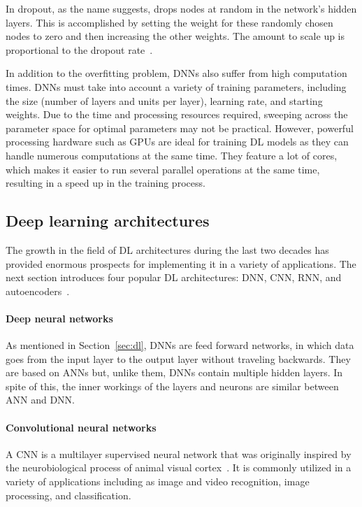 In dropout, as the name suggests, drops nodes at random in the network's hidden layers. This is accomplished by setting the weight for these randomly chosen nodes to zero and then increasing the other weights. The amount to scale up is proportional to the dropout rate~\cite{Brownlee2019HowNetworks}.

In addition to the overfitting problem, \gls{DNN}s also suffer from high computation times. \gls{DNN}s must take into account a variety of training parameters, including the size (number of layers and units per layer), learning rate, and starting weights. Due to the time and processing resources required, sweeping across the parameter space for optimal parameters may not be practical. However, powerful processing hardware such as \gls{GPU}s are ideal for training \gls{DL} models as they can handle numerous computations at the same time. They feature a lot of cores, which makes it easier to run several parallel operations at the same time, resulting in a speed up in the training process.

\subsection{Deep learning architectures}

The growth in the field of \gls{DL} architectures during the last two decades has provided enormous prospects for implementing it in a variety of applications. The next section introduces four popular \gls{DL} architectures: \gls{DNN}, \gls{CNN}, \gls{RNN}, and autoencoders~\cite{Ganatra2018ATools,Madhavan2021DeepDeveloper}.

\paragraph{Deep neural networks} 

As mentioned in Section~\ref{sec:dl}, \gls{DNN}s are feed forward networks, in which data goes from the input layer to the output layer without traveling backwards. They are based on \gls{ANN}s but, unlike them, \gls{DNN}s contain multiple hidden layers. In spite of this, the inner workings of the layers and neurons are similar between \gls{ANN} and \gls{DNN}.

\paragraph{Convolutional neural networks} 

A \gls{CNN} is a multilayer supervised neural network that was originally inspired by the neurobiological process of animal visual cortex~\cite{Ganatra2018ATools}. It is commonly utilized in a variety of applications including as image and video recognition, image processing, and classification.

